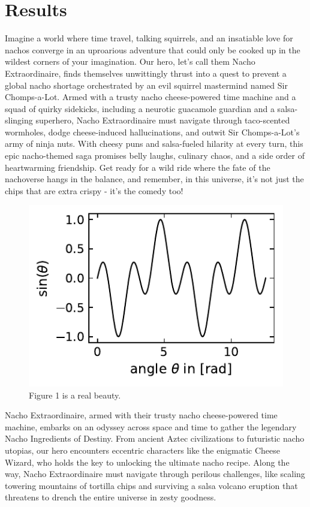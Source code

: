 \section{Results}

Imagine a world where time travel, talking squirrels, and an insatiable love for nachos converge in an uproarious adventure that could only be cooked up in the wildest corners of your imagination. Our hero, let's call them Nacho Extraordinaire, finds themselves unwittingly thrust into a quest to prevent a global nacho shortage orchestrated by an evil squirrel mastermind named Sir Chomps-a-Lot. Armed with a trusty nacho cheese-powered time machine and a squad of quirky sidekicks, including a neurotic guacamole guardian and a salsa-slinging superhero, Nacho Extraordinaire must navigate through taco-scented wormholes, dodge cheese-induced hallucinations, and outwit Sir Chomps-a-Lot's army of ninja nuts. With cheesy puns and salsa-fueled hilarity at every turn, this epic nacho-themed saga promises belly laughs, culinary chaos, and a side order of heartwarming friendship. Get ready for a wild ride where the fate of the nachoverse hangs in the balance, and remember, in this universe, it's not just the chips that are extra crispy - it's the comedy too!

\begin{figure}[ht]
	\centering
	\includegraphics[scale=1]{../Figures/figure1.pdf}%
	\caption{Figure 1 is a real beauty.}
	\label{fig:figure1}	
\end{figure}


Nacho Extraordinaire, armed with their trusty nacho cheese-powered time machine, embarks on an odyssey across space and time to gather the legendary Nacho Ingredients of Destiny. From ancient Aztec civilizations to futuristic nacho utopias, our hero encounters eccentric characters like the enigmatic Cheese Wizard, who holds the key to unlocking the ultimate nacho recipe. Along the way, Nacho Extraordinaire must navigate through perilous challenges, like scaling towering mountains of tortilla chips and surviving a salsa volcano eruption that threatens to drench the entire universe in zesty goodness.

